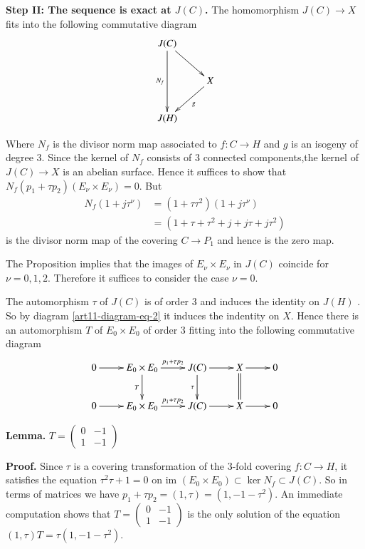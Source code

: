 \medskip
\noindent
{\bfseries Step II: The sequence is exact at $J(C)$.} The homomorphism $J(C) \rightarrow X $ fits into the following commutative diagram
\begin{equation}\label{art11-step II-eq -2}
\vcenter{
\xymatrix{
J(C)\ar[dr]\ar[dd]_-{N_{f}} & \\
    &X \ar[dl]^-{g}\\
J(H)  &     
}}
\end{equation}


Where $N_{f}$ is the divisor norm map associated to $f: C\rightarrow H$ and $g$ is an isogeny of degree 3. Since the kernel of $N_{f}$ consists of 3 connected components,the kernel of $J(C)\rightarrow X$ is an abelian surface. Hence it suffices to show that $N_{f}(p_{1} + \tau p_{2})(E_{\nu} \times E_{\nu})=0$. But
\begin{align*}
N_{f}(1 + j\tau^{\nu})&= (1 +\tau \tau^{2})(1 + j\tau^{\nu})\\
                      &=(1+ \tau + \tau^{2} + j + j\tau + j\tau^{2})
\end{align*}
is the divisor norm map of the covering $C\rightarrow P_{1}$ and hence is the zero map.

The Proposition implies that the images of $E_{\nu} \times E_{\nu}$ in $J(C)$ coincide for $\nu =0,1,2$. Therefore it suffices to consider the case $\nu=0$.

The automorphism $\tau$ of $J(C)$ is of order 3 and induces the identity on $J(H)$ . So by diagram \eqref{art11-diagram-eq-2} it induces the indentity on $X$. Hence there is an automorphism $T$ of $ E_{0} \times E_{0}$ of order 3 fitting into the following commutative diagram
$$
\xymatrix{
0 \ar[r] & E_{0}\times E_{0} \ar[d]_-{T} \ar[r]^-{p_{1}+\tau p_{2}}& J(C)\ar[d]_-{\tau}\ar[r] & X\ar@{=}[d] \ar[r] & 0\\
0 \ar[r] &E_{0}\times E_{0}  \ar[r]^-{p_{1}+\tau p_{2}} & J(C)\ar[r] & X \ar[r] & 0
}
$$ 

\medskip
\noindent
{\bfseries {} Lemma.\label{art11-lemma-5.3}}
$T=\begin{pmatrix}
0 & -1\\
1 & -1
\end{pmatrix}
$

\medskip
\noindent
{\bfseries Proof.} Since $\tau$ is a covering transformation of the 3-fold covering $f: C\rightarrow H$, it satisfies the equation $\tau^{2} \tau + 1 =0$ on im $(E_{0}\times E_{0})\subset \ker N_{f} \subset J(C)$. So in terms of matrices we have $p_{1} + \tau p_{2} = (1, \tau)=(1,-1-\tau^{2})$. An immediate computation shows that
$T = \begin{pmatrix}
0 & -1\\
1 & -1
\end{pmatrix}
$ is the only solution of the equation $(1,\tau)T=\tau(1,-1-\tau^{2})$.

